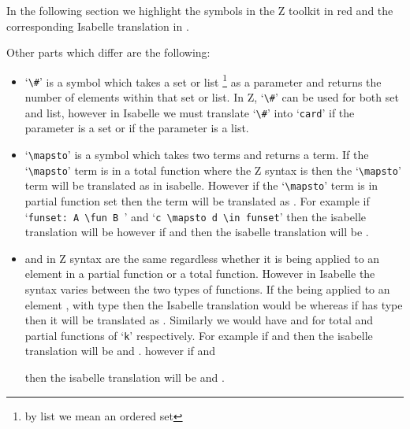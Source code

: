 In the following section we highlight the symbols in the Z toolkit in {\color{set}red}
and the corresponding Isabelle translation in {\color{blue}{blue}}.

Other parts which differ are the following:

\begin{itemize}
\item {\color{red}`\verb|\#|'} is a symbol which takes a set or list \footnote{by list we
mean an ordered set} as a parameter and returns the number of elements within
that set or list. In Z, {\color{red}`\verb|\#|'} can be used for both set and list, however
in Isabelle we must translate {\color{red}`\verb|\#|'} into {\color{blue}`\verb|card|'} if the parameter is
a set or {\color{blue}{`\verb|length|'}} if the parameter is a list.

\item {\color{red}`\verb|\mapsto|'} is a symbol which takes two terms and returns a term. If
the {\color{red}`\verb|\mapsto|'} term is in a total function where the Z syntax is {\color{red}{`\verb|A \fun B|'}} then the 
{\color{red}`\verb|\mapsto|'} term will be translated as {\color{blue}{`\verb|(f,s)|'}} in isabelle. However if the
{\color{red}`\verb|\mapsto|'} term is in partial function set then the {\color{red}{`\verb|\mapsto|'}} term will be
translated as {\color{blue}{`\verb|f s|'}}.
For example
if {\color{red}`\verb|funset: A \fun B |'} and {\color{red}`\verb|c \mapsto d \in funset|'}
then the isabelle translation will be {\color{blue}{$(c,d) \in funset$}}
however if {\color{red}{`\verb|pfunset: A \pfun B |'}} and {\color{red}{`\verb|c \mapsto d \in pfunset|'}}
then the isabelle translation will be {\color{blue}{$c\ d \in pfunset$}}.

\item {\color{red}{`\verb|\dom|'}} and {\color{red}{`\verb|\ran|'}} in Z syntax are the same regardless whether it is
being applied to an element in a partial function or a total function. However
in Isabelle the syntax varies between the two types of functions. If the
{\color{red}{`\verb|\dom|'}} being applied to an element {\color{red}{`\verb|k|'}}, with type
{\color{red}{`\verb|A \fun B|'}} then the Isabelle translation would be {\color{blue}{`\verb|Domain k|'}} whereas if
{\color{red}{`\verb|k|'}} has type {\color{red}{`\verb|A \pfun B|'}} then it will be
translated as {\color{blue}{`\verb|dom k|'}}. Similarly we would
have {\color{blue}{`\verb|Range k|'}} and {\color{blue}{`\verb|ran k|'}} for total and partial functions of
`\verb|k|' respectively.
For example
if {\color{red}{`\verb|funset: A \fun B |'}} and {\color{red}{`\verb|\dom k \in funset|'}}
then the isabelle translation will be {\color{blue}{$(A*B) set$}} and {\color{blue}{$Domain\ k \in funset$}}.
however if {\color{red}{`\verb|pfunset: A \pfun B |'}} and

{\color{red}{`\verb|\dom k \in pfunset|'}}
then the isabelle translation will be {\color{blue}{$A \rightharpoonup B$}} and {\color{blue}{$dom\ k$}}.

\end{itemize}

